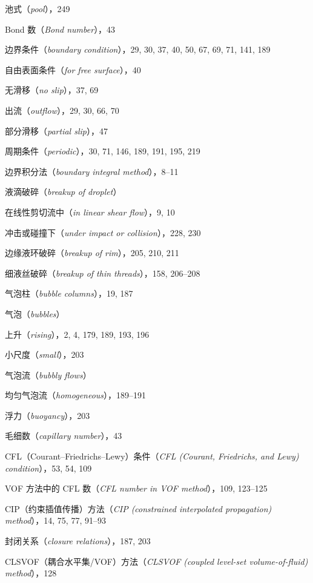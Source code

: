 \documentclass[11pt,a4paper,openany,fontset=none]{ctexbook}
\begin{document}
\quad 池式（\textit{pool}），249\par
Bond 数（\textit{Bond number}），43\par
边界条件（\textit{boundary condition}），29, 30, 37, 40, 50, 67, 69, 71, 141, 189\par
\quad 自由表面条件（\textit{for free surface}），40\par
\quad 无滑移（\textit{no slip}），37, 69\par
\quad 出流（\textit{outflow}），29, 30, 66, 70\par
\quad 部分滑移（\textit{partial slip}），47\par
\quad 周期条件（\textit{periodic}），30, 71, 146, 189, 191, 195, 219\par
边界积分法（\textit{boundary integral method}），8--11\par
液滴破碎（\textit{breakup of droplet}）\par
\quad 在线性剪切流中（\textit{in linear shear flow}），9, 10\par
\quad 冲击或碰撞下（\textit{under impact or collision}），228, 230\par
边缘液环破碎（\textit{breakup of rim}），205, 210, 211\par
细液丝破碎（\textit{breakup of thin threads}），158, 206--208\par
气泡柱（\textit{bubble columns}），19, 187\par
气泡（\textit{bubbles}）\par
\quad 上升（\textit{rising}），2, 4, 179, 189, 193, 196\par
\quad 小尺度（\textit{small}），203\par
气泡流（\textit{bubbly flows}）\par
均匀气泡流（\textit{homogeneous}），189--191\par
浮力（\textit{buoyancy}），203\par
毛细数（\textit{capillary number}），43\par
CFL（Courant--Friedrichs--Lewy）条件（\textit{CFL (Courant, Friedrichs, and Lewy) condition}），53, 54, 109\par
VOF 方法中的 CFL 数（\textit{CFL number in VOF method}），109, 123--125\par
CIP（约束插值传播）方法（\textit{CIP (constrained interpolated propagation) method}），14, 75, 77, 91--93\par
封闭关系（\textit{closure relations}），187, 203\par
CLSVOF（耦合水平集/VOF）方法（\textit{CLSVOF (coupled level-set volume-of-fluid) method}），128\par
\end{document}
